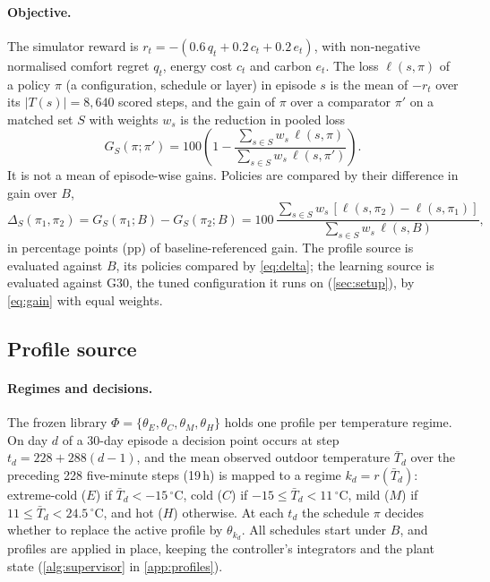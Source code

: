 \documentclass{article}
\begin{document}
\paragraph{Objective.}
The simulator reward is $r_t = -(0.6\,q_t + 0.2\,c_t + 0.2\,e_t)$, with non-negative normalised comfort regret $q_t$, energy
cost $c_t$ and carbon $e_t$. The loss $\ell(s,\pi)$ of a policy $\pi$ (a configuration, schedule or layer) in episode $s$ is the mean of $-r_t$ over its $|T(s)| = 8{,}640$
scored steps, and the gain of $\pi$ over a comparator $\pi'$ on a matched set $S$ with weights $w_s$ is the reduction in
pooled loss
\begin{equation}
  G_S(\pi;\pi') = 100\left(1 - \frac{\sum_{s\in S} w_s\,\ell(s,\pi)}{\sum_{s\in S} w_s\,\ell(s,\pi')}\right).
  \label{eq:gain}
\end{equation}
It is not a mean of episode-wise gains. Policies are compared by their difference in gain over $B$,
\begin{equation}
  \Delta_S(\pi_1,\pi_2) = G_S(\pi_1;B) - G_S(\pi_2;B)
  = 100\,\frac{\sum_{s\in S} w_s\,[\ell(s,\pi_2) - \ell(s,\pi_1)]}{\sum_{s\in S} w_s\,\ell(s,B)},
  \label{eq:delta}
\end{equation}
in percentage points (pp) of baseline-referenced gain. The profile source is evaluated against $B$, its
policies compared by \cref{eq:delta}; the learning source is evaluated against G30, the tuned configuration it runs on
(\cref{sec:setup}), by \cref{eq:gain} with equal weights.

\subsection{Profile source}\label{sec:profilesource}
\paragraph{Regimes and decisions.}
The frozen library $\Phi = \{\theta_E, \theta_C, \theta_M, \theta_H\}$ holds one profile per temperature regime. On day
$d$ of a 30-day episode a decision point occurs at step $t_d = 228 + 288(d-1)$, and the mean observed outdoor temperature
$\bar T_d$ over the preceding 228 five-minute steps (19\,h) is mapped to a regime $k_d = r(\bar T_d)$: extreme-cold ($E$) if $\bar T_d < -15\,^\circ$C, cold ($C$) if
$-15 \le \bar T_d < 11\,^\circ$C, mild ($M$) if $11 \le \bar T_d < 24.5\,^\circ$C, and hot ($H$) otherwise. At each $t_d$ the schedule $\pi$ decides whether to replace the
active profile by $\theta_{k_d}$. All schedules start under $B$, and profiles are applied in place, keeping the
controller's integrators and the plant state (\cref{alg:supervisor} in \cref{app:profiles}).
\end{document}
